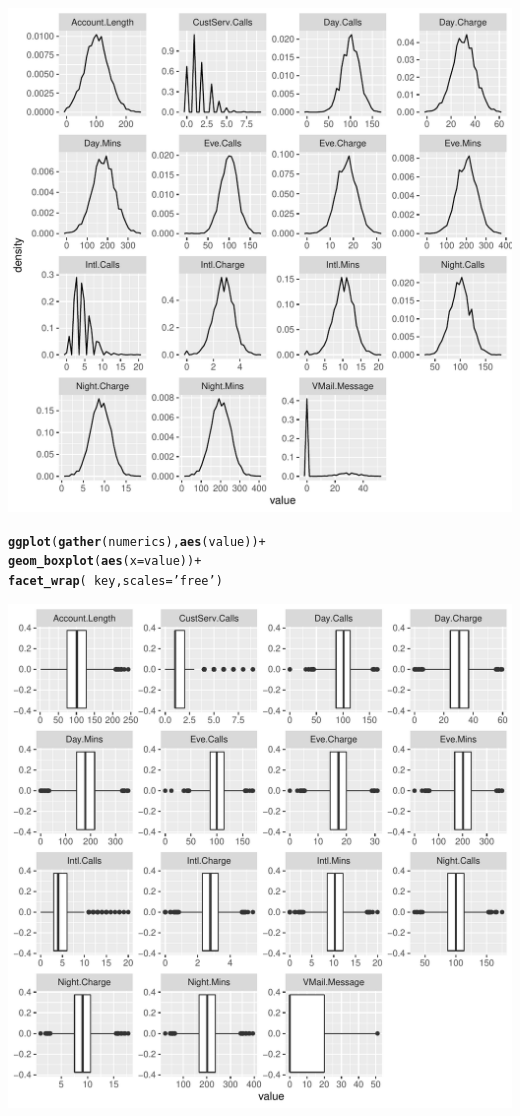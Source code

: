 \documentclass{article}\usepackage[]{graphicx}\usepackage[]{color}
\makeatletter
\def\maxwidth{ %
  \ifdim\Gin@nat@width>\linewidth
    \linewidth
  \else
    \Gin@nat@width
  \fi
}
\newcommand{\hlstr}[1]{\textcolor[rgb]{0.192,0.494,0.8}{#1}}%
\newcommand{\hlopt}[1]{\textcolor[rgb]{0,0,0}{#1}}%
\newcommand{\hlstd}[1]{\textcolor[rgb]{0.345,0.345,0.345}{#1}}%
\newcommand{\hlkwc}[1]{\textcolor[rgb]{0.333,0.667,0.333}{#1}}%
\newcommand{\hlkwd}[1]{\textcolor[rgb]{0.737,0.353,0.396}{\textbf{#1}}}%
\newenvironment{kframe}{%
 \def\at@end@of@kframe{}%
 \ifinner\ifhmode%
  \def\at@end@of@kframe{\end{minipage}}%
  \begin{minipage}{\columnwidth}%
 \fi\fi%
 \def\FrameCommand##1{\hskip\@totalleftmargin \hskip-\fboxsep
 \colorbox{shadecolor}{##1}\hskip-\fboxsep
     \hskip-\linewidth \hskip-\@totalleftmargin \hskip\columnwidth}%
 \MakeFramed {\advance\hsize-\width
   \@totalleftmargin\z@ \linewidth\hsize
   \@setminipage}}%
 {\par\unskip\endMakeFramed%
 \at@end@of@kframe}
\newenvironment{knitrout}{}{} %
\makeatother
\begin{document}
\begin{description}
\begin{knitrout}
\includegraphics[width=\maxwidth]{figure/Overviews_plots-2} 
\begin{kframe}\begin{alltt}
\hlkwd{ggplot}\hlstd{(}\hlkwd{gather}\hlstd{(numerics),} \hlkwd{aes}\hlstd{(value))} \hlopt{+}
  \hlkwd{geom_boxplot}\hlstd{(}\hlkwd{aes}\hlstd{(}\hlkwc{x}\hlstd{=value))} \hlopt{+}
  \hlkwd{facet_wrap}\hlstd{(}\hlopt{~}\hlstd{key,} \hlkwc{scales}\hlstd{=}\hlstr{'free'}\hlstd{)}
\end{alltt}
\end{kframe}
\includegraphics[width=\maxwidth]{figure/Overviews_plots-3} 


\end{knitrout}
\end{description}
\end{document}
